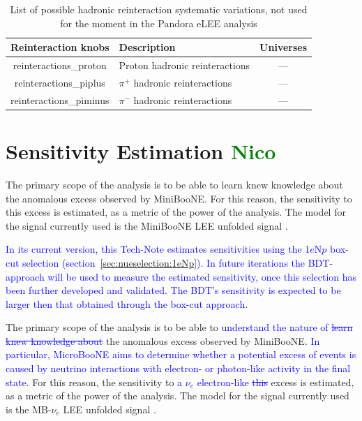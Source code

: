 \documentclass[a4paper]{article}
\begin{document}
\begin{table}[H]
\centering
 \begin{tabular}{| c | m{6cm} | c |} 
    \hline
\hline
Reinteraction knobs & Description & Universes \\
\hline
reinteractions\_proton        &  Proton hadronic reinteractions  & ---\\ 
reinteractions\_piplus   &  $\pi^+$ hadronic reinteractions & ---\\ 
reinteractions\_piminus        & $\pi^-$ hadronic reinteractions  & ---\\ 
\hline
\end{tabular}
\caption{List of possible hadronic reinteraction systematic variations, not used for the moment in the Pandora eLEE analysis}
\label{tab:fluxsyst}
\end{table}

\newpage

\section{Sensitivity Estimation \textcolor{green}{Nico}}

\label{sec:Sensitivity2Osc}
The primary scope of the analysis is to be able to learn knew knowledge about the anomalous excess observed by MiniBooNE.
For this reason, the sensitivity to this excess is estimated, as a metric of the power of the analysis.
The model for the signal currently used is the MiniBooNE LEE unfolded signal \cite{bib:sbnfit20437}.

\label{sec:sensitivity}

\par \textcolor{blue}{In its current version, this Tech-Note estimates sensitivities using the 1$e$N$p$ box-cut selection (section~\ref{sec:nueselection:1eNp}). In future iterations the BDT-approach will be used to measure the estimated sensitivity, once this selection has been further developed and validated. The BDT's sensitivity is expected to be larger then that obtained through the box-cut approach.} 
\par The primary scope of the analysis is to be able to \textcolor{blue}{understand the nature of \st{learn knew knowledge about}} the anomalous excess observed by MiniBooNE. \textcolor{blue}{In particular, MicroBooNE aims to determine whether a potential excess of events is caused by neutrino interactions with electron- or photon-like activity in the final state.}
For this reason, the sensitivity to \textcolor{blue}{a $\nu_e$ electron-like \st{this}} excess is estimated, as a metric of the power of the analysis.
The model for the signal currently used is the MB-$\nu_e$ LEE unfolded signal \cite{bib:sbnfit20437}.
\end{document}
